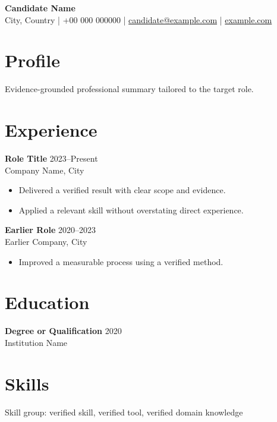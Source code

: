 \documentclass[10pt,a4paper]{article}
\begin{document}
{\LARGE\bfseries Candidate Name}\\[3pt]
City, Country \quad | \quad +00 000 000000 \quad | \quad
\href{mailto:candidate@example.com}{candidate@example.com} \quad | \quad
\href{https://example.com}{example.com}

\section*{Profile}
Evidence-grounded professional summary tailored to the target role.

\section*{Experience}
\textbf{Role Title} \hfill 2023--Present\\
Company Name, City
\begin{itemize}
  \item Delivered a verified result with clear scope and evidence.
  \item Applied a relevant skill without overstating direct experience.
\end{itemize}

\textbf{Earlier Role} \hfill 2020--2023\\
Earlier Company, City
\begin{itemize}
  \item Improved a measurable process using a verified method.
\end{itemize}

\section*{Education}
\textbf{Degree or Qualification} \hfill 2020\\
Institution Name

\section*{Skills}
Skill group: verified skill, verified tool, verified domain knowledge
\end{document}
